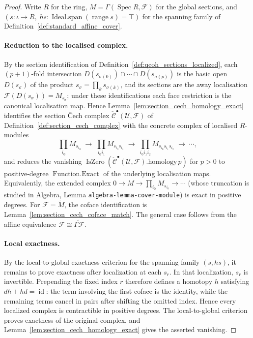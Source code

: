 \begin{proof}
  Write \(R\) for the ring, \(M = \Gamma(\operatorname{Spec} R, \mathcal{F})\) for the
  global sections, and \((s : \iota \to R,\; hs : \operatorname{Ideal.span}
  (\operatorname{range} s) = \top)\) for the spanning family of
  Definition~\ref{def:standard_affine_cover}.

  \paragraph{Reduction to the localised complex.}
  By the section identification of Definition~\ref{def:qcoh_sections_localized}, each
  \((p+1)\)-fold intersection \(D(s_{\sigma(0)}) \cap \cdots \cap D(s_{\sigma(p)})\)
  is the basic open \(D(s_\sigma)\) of the product
  \(s_\sigma = \prod_{k} s_{\sigma(k)}\), and its sections are the away localisation
  \(\mathcal{F}(D(s_\sigma)) = M_{s_\sigma}\); under these identifications each face
  restriction is the canonical localisation map. Hence
  Lemma~\ref{lem:section_cech_homology_exact} identifies the section {\v C}ech complex
  \(\check{\mathcal{C}}^\bullet(\mathcal{U}, \mathcal{F})\) of
  Definition~\ref{def:section_cech_complex} with the concrete complex of localised
  \(R\)-modules
  \[
    \prod_{i_0} M_{s_{i_0}} \;\to\;
    \prod_{i_0 i_1} M_{s_{i_0} s_{i_1}} \;\to\;
    \prod_{i_0 i_1 i_2} M_{s_{i_0} s_{i_1} s_{i_2}} \;\to\; \cdots,
  \]
  and reduces the vanishing
  \(\operatorname{IsZero}(\check{\mathcal{C}}^\bullet(\mathcal{U},
  \mathcal{F}).\mathrm{homology}\, p)\) for \(p > 0\) to positive-degree
  \(\operatorname{Function.Exact}\) of the underlying localisation maps. Equivalently,
  the extended complex \(0 \to M \to \prod_{i_0} M_{s_{i_0}} \to \cdots\) (whose
  truncation is studied in Algebra, Lemma \texttt{algebra-lemma-cover-module}) is
  exact in positive degrees. For \(\mathcal{F}=\widetilde M\), the coface
  identification is Lemma~\ref{lem:section_cech_coface_match}. The general case follows
  from the affine equivalence
  \(\mathcal{F}\cong\widetilde{\Gamma\mathcal{F}}\).

  \paragraph{Local exactness.}
  By the local-to-global exactness criterion for the spanning family \((s,hs)\), it
  remains to prove exactness after localization at each \(s_r\). In that localization,
  \(s_r\) is invertible. Prepending the fixed index \(r\) therefore defines a homotopy
  \(h\) satisfying \(dh+hd=\operatorname{id}\): the term involving the first coface is
  the identity, while the remaining terms cancel in pairs after shifting the omitted
  index. Hence every localized complex is contractible in positive degrees. The
  local-to-global criterion proves exactness of the original complex, and
  Lemma~\ref{lem:section_cech_homology_exact} gives the asserted vanishing.
\end{proof}

